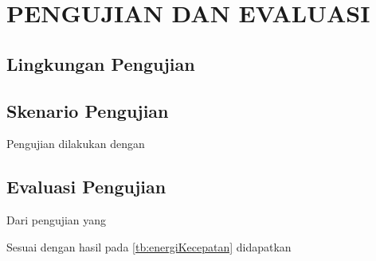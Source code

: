 \chapter{PENGUJIAN DAN EVALUASI}
\vspace{4ex}

\setlength{\parindent}{7ex}


\section{Lingkungan Pengujian}
\vspace{1ex}

\lipsum[1]
\vspace{0.5ex}

\section{Skenario Pengujian}
\vspace{1ex}

Pengujian dilakukan dengan \lipsum[1]
\vspace{0.5ex}

\section{Evaluasi Pengujian}
\vspace{1ex}

Dari pengujian yang \lipsum[2]
\vspace{0.5ex}

Sesuai dengan hasil pada \ref{tb:energiKecepatan} didapatkan \lipsum[3]


\vspace{1ex}

\lipsum[4]
\vspace{0.5ex}